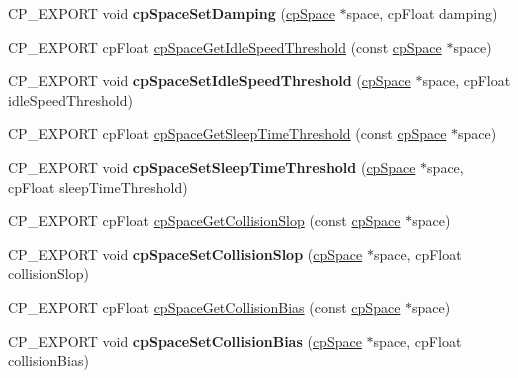 \begin{DoxyCompactItemize}
\item 
\mbox{\label{group__cpSpace_ga02641468aa07e3120d73b4d33cb7e780}} 
C\+P\+\_\+\+E\+X\+P\+O\+RT void {\bfseries cp\+Space\+Set\+Damping} (\hyperlink{structcpSpace}{cp\+Space} $\ast$space, cp\+Float damping)
\item 
C\+P\+\_\+\+E\+X\+P\+O\+RT cp\+Float \hyperlink{group__cpSpace_ga256c38475826c4c165999079929fe1e7}{cp\+Space\+Get\+Idle\+Speed\+Threshold} (const \hyperlink{structcpSpace}{cp\+Space} $\ast$space)
\item 
\mbox{\label{group__cpSpace_gacb84ce106473ddfeafafcf4a4cd67993}} 
C\+P\+\_\+\+E\+X\+P\+O\+RT void {\bfseries cp\+Space\+Set\+Idle\+Speed\+Threshold} (\hyperlink{structcpSpace}{cp\+Space} $\ast$space, cp\+Float idle\+Speed\+Threshold)
\item 
C\+P\+\_\+\+E\+X\+P\+O\+RT cp\+Float \hyperlink{group__cpSpace_gab3f74ae04501ce532913c87e5be54a80}{cp\+Space\+Get\+Sleep\+Time\+Threshold} (const \hyperlink{structcpSpace}{cp\+Space} $\ast$space)
\item 
\mbox{\label{group__cpSpace_gab593e909d82ad4824a7d1c2d6f397147}} 
C\+P\+\_\+\+E\+X\+P\+O\+RT void {\bfseries cp\+Space\+Set\+Sleep\+Time\+Threshold} (\hyperlink{structcpSpace}{cp\+Space} $\ast$space, cp\+Float sleep\+Time\+Threshold)
\item 
C\+P\+\_\+\+E\+X\+P\+O\+RT cp\+Float \hyperlink{group__cpSpace_ga7b5e6178a021b1b6bba4b70876bf79d0}{cp\+Space\+Get\+Collision\+Slop} (const \hyperlink{structcpSpace}{cp\+Space} $\ast$space)
\item 
\mbox{\label{group__cpSpace_gaa962f544b92ee508abd689729ceaaa9a}} 
C\+P\+\_\+\+E\+X\+P\+O\+RT void {\bfseries cp\+Space\+Set\+Collision\+Slop} (\hyperlink{structcpSpace}{cp\+Space} $\ast$space, cp\+Float collision\+Slop)
\item 
C\+P\+\_\+\+E\+X\+P\+O\+RT cp\+Float \hyperlink{group__cpSpace_ga53b093e1cbb978e00faf9216e1f9ab4f}{cp\+Space\+Get\+Collision\+Bias} (const \hyperlink{structcpSpace}{cp\+Space} $\ast$space)
\item 
\mbox{\label{group__cpSpace_ga46bf525e4d6c7eb83a5222e118168c60}} 
C\+P\+\_\+\+E\+X\+P\+O\+RT void {\bfseries cp\+Space\+Set\+Collision\+Bias} (\hyperlink{structcpSpace}{cp\+Space} $\ast$space, cp\+Float collision\+Bias)

\end{DoxyCompactItemize}

